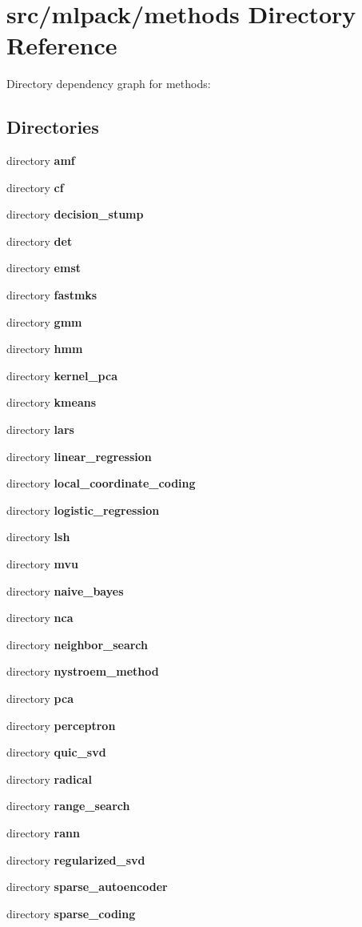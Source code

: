 \section{src/mlpack/methods Directory Reference}
\label{dir_2217eda3f3f128182276a15ca80cc98e}
Directory dependency graph for methods\-:
\subsection*{Directories}
\begin{DoxyCompactItemize}
\item 
directory {\bf amf}
\item 
directory {\bf cf}
\item 
directory {\bf decision\-\_\-stump}
\item 
directory {\bf det}
\item 
directory {\bf emst}
\item 
directory {\bf fastmks}
\item 
directory {\bf gmm}
\item 
directory {\bf hmm}
\item 
directory {\bf kernel\-\_\-pca}
\item 
directory {\bf kmeans}
\item 
directory {\bf lars}
\item 
directory {\bf linear\-\_\-regression}
\item 
directory {\bf local\-\_\-coordinate\-\_\-coding}
\item 
directory {\bf logistic\-\_\-regression}
\item 
directory {\bf lsh}
\item 
directory {\bf mvu}
\item 
directory {\bf naive\-\_\-bayes}
\item 
directory {\bf nca}
\item 
directory {\bf neighbor\-\_\-search}
\item 
directory {\bf nystroem\-\_\-method}
\item 
directory {\bf pca}
\item 
directory {\bf perceptron}
\item 
directory {\bf quic\-\_\-svd}
\item 
directory {\bf radical}
\item 
directory {\bf range\-\_\-search}
\item 
directory {\bf rann}
\item 
directory {\bf regularized\-\_\-svd}
\item 
directory {\bf sparse\-\_\-autoencoder}
\item 
directory {\bf sparse\-\_\-coding}
\end{DoxyCompactItemize}
